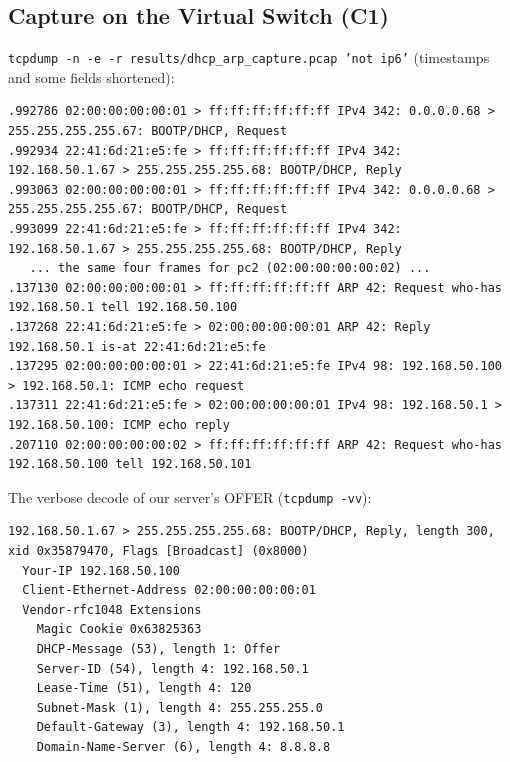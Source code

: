 \documentclass[11pt]{article}
\begin{document}
\subsection{Capture on the Virtual Switch (C1)}
\texttt{tcpdump -n -e -r results/dhcp\_arp\_capture.pcap 'not ip6'} (timestamps and some
fields shortened):
\begin{lstlisting}[style=log]
.992786 02:00:00:00:00:01 > ff:ff:ff:ff:ff:ff IPv4 342: 0.0.0.0.68 > 255.255.255.255.67: BOOTP/DHCP, Request
.992934 22:41:6d:21:e5:fe > ff:ff:ff:ff:ff:ff IPv4 342: 192.168.50.1.67 > 255.255.255.255.68: BOOTP/DHCP, Reply
.993063 02:00:00:00:00:01 > ff:ff:ff:ff:ff:ff IPv4 342: 0.0.0.0.68 > 255.255.255.255.67: BOOTP/DHCP, Request
.993099 22:41:6d:21:e5:fe > ff:ff:ff:ff:ff:ff IPv4 342: 192.168.50.1.67 > 255.255.255.255.68: BOOTP/DHCP, Reply
   ... the same four frames for pc2 (02:00:00:00:00:02) ...
.137130 02:00:00:00:00:01 > ff:ff:ff:ff:ff:ff ARP 42: Request who-has 192.168.50.1 tell 192.168.50.100
.137268 22:41:6d:21:e5:fe > 02:00:00:00:00:01 ARP 42: Reply 192.168.50.1 is-at 22:41:6d:21:e5:fe
.137295 02:00:00:00:00:01 > 22:41:6d:21:e5:fe IPv4 98: 192.168.50.100 > 192.168.50.1: ICMP echo request
.137311 22:41:6d:21:e5:fe > 02:00:00:00:00:01 IPv4 98: 192.168.50.1 > 192.168.50.100: ICMP echo reply
.207110 02:00:00:00:00:02 > ff:ff:ff:ff:ff:ff ARP 42: Request who-has 192.168.50.100 tell 192.168.50.101
\end{lstlisting}
The verbose decode of our server's OFFER (\texttt{tcpdump -vv}):
\begin{lstlisting}[style=log]
192.168.50.1.67 > 255.255.255.255.68: BOOTP/DHCP, Reply, length 300, xid 0x35879470, Flags [Broadcast] (0x8000)
  Your-IP 192.168.50.100
  Client-Ethernet-Address 02:00:00:00:00:01
  Vendor-rfc1048 Extensions
    Magic Cookie 0x63825363
    DHCP-Message (53), length 1: Offer
    Server-ID (54), length 4: 192.168.50.1
    Lease-Time (51), length 4: 120
    Subnet-Mask (1), length 4: 255.255.255.0
    Default-Gateway (3), length 4: 192.168.50.1
    Domain-Name-Server (6), length 4: 8.8.8.8
\end{lstlisting}
\end{document}
